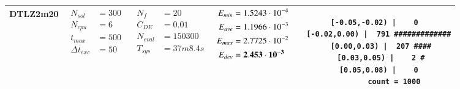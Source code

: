 \begin{table*} [!t]
\begin{tabular}[c]{ccccc}
\hline



DTLZ2m20
&
{$\!\begin{aligned}
    N_{sol}        &= 300 \\
	N_{cpu}        &= 6 \\
	t_{max}        &= 500 \\
	\Delta t_{exc} &= 50
\end{aligned}$}
&
{$\!\begin{aligned}
	N_{f}    &= 20 \\
	C_{DE}   &= 0.01 \\
	N_{eval} &= 150300 \\
	T_{sys}  &= 37m8.4s
\end{aligned}$}
&
{$\!\begin{aligned}
    E_{min} &= 1.5243\cdot 10^{-4} \\
    E_{ave} &= 1.1966\cdot 10^{-3} \\
    E_{max} &= 2.7725\cdot 10^{-2} \\
    E_{dev} &= {\bf 2.453\cdot 10^{-3}}
\end{aligned}$}
&
\begin{minipage}{4.1cm} \fontsize{5pt}{6pt}
\begin{verbatim}
 [-0.05,-0.02) |    0 
  [-0.02,0.00) |  791 #############
   [0.00,0.03) |  207 ####
   [0.03,0.05) |    2 #
   [0.05,0.08) |    0 
         count = 1000
 \end{verbatim}
\end{minipage} \\

\bottomrule


\end{tabular}
\label{tab:many-obj:A}
\end{table*}






